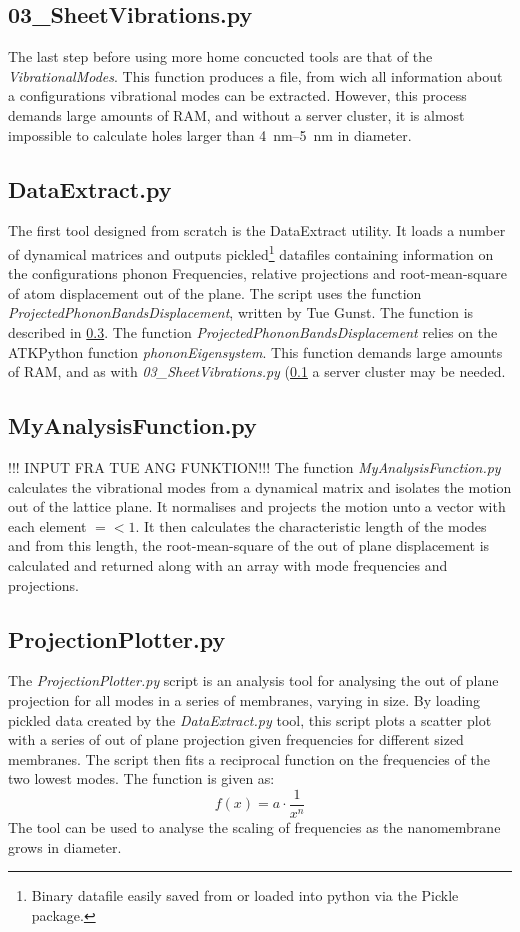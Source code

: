 \subsection{03\_SheetVibrations.py}\label{03}
The last step before using more home concucted tools are that of the \textit{VibrationalModes}. This function produces a file, from wich all information about a configurations vibrational modes can be extracted. However, this process demands large amounts of RAM, and without a server cluster, it is almost impossible to calculate holes larger than \SIrange{4}{5}{\nm} in diameter.
\subsection{DataExtract.py}\label{DE}
The first tool designed from scratch is the DataExtract utility. It loads a number of dynamical matrices and outputs pickled\footnote{Binary datafile easily saved from or loaded into python via the Pickle package.} datafiles containing information on the configurations phonon Frequencies, relative projections and root-mean-square of atom displacement out of the plane. The script uses the function \textit{ProjectedPhononBandsDisplacement}, written by Tue Gunst. The function is described in \cref{MAF}.
The function \textit{ProjectedPhononBandsDisplacement} relies on the ATKPython function \textit{phononEigensystem}. This function demands large amounts of RAM, and as with \textit{03\_SheetVibrations.py} (\cref{03} a server cluster may be needed.
\subsection{MyAnalysisFunction.py}\label{MAF}
!!! INPUT FRA TUE ANG FUNKTION!!!
The function \textit{MyAnalysisFunction.py} calculates the vibrational modes from a dynamical matrix and isolates the motion out of the lattice plane. It normalises and projects the motion unto a vector with each element $=< 1$. It then calculates the characteristic length of the modes and from this length, the root-mean-square of the out of plane displacement is calculated and returned along with an array with mode frequencies and projections.
\subsection{ProjectionPlotter.py}
The \textit{ProjectionPlotter.py} script is an analysis tool for analysing the out of plane projection for all modes in a series of membranes, varying in size. By loading pickled data created by the \textit{DataExtract.py} tool, this script plots a scatter plot with a series of out of plane projection given frequencies for different sized membranes. The script then fits a reciprocal function on the frequencies of the two lowest modes.
The function is given as:
\begin{equation}
  f(x) = a \cdot \frac{1}{x^n}
\end{equation}
The tool can be used to analyse the scaling of frequencies as the nanomembrane grows in diameter.
